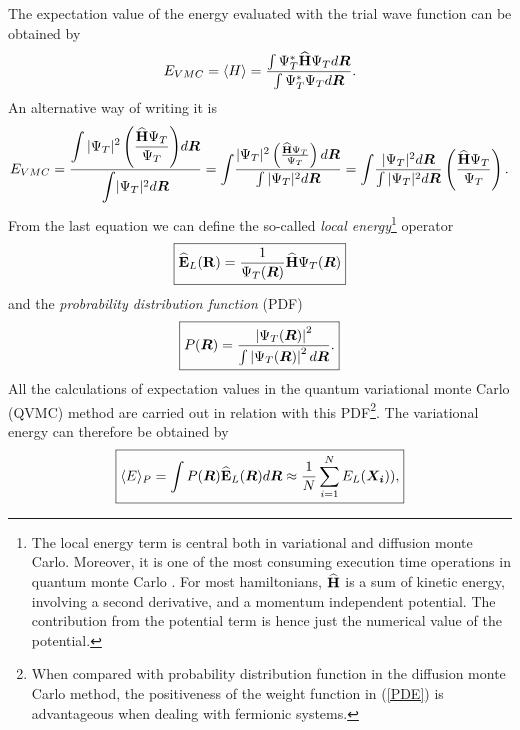 The expectation value of the energy evaluated with the trial wave function can be obtained by
\begin{equation}\label{evmc}
 E_{VMC}= \langle H \rangle =
   \frac{\int \Psi_{T}^{\ast} {\bf\widehat{H}} \Psi_T d{\boldsymbol{R}}}
        {\int \Psi_{T}^{\ast} \Psi_T d{\boldsymbol{R}}}.
\end{equation}
An alternative way of writing it is
\begin{equation}\label{derivationsVMC}
 E_{VMC}=  \frac{{\displaystyle\int |\Psi_{T}|^2 \left(\frac{{\bf\widehat{H}} \Psi_T }{\Psi_T}\right)} d{\boldsymbol{R}}}
        {{\displaystyle\int} |\Psi_{T}|^2 d\boldsymbol{R}} = {\displaystyle\int} \frac{|\Psi_{T}|^2 \left(\frac{{\bf\widehat{H}} \Psi_T }{\Psi_T}\right) d{\boldsymbol{R}}}{
        \int |\Psi_{T}|^2 d\boldsymbol{R}} = {\displaystyle\int} \frac{|\Psi_{T}|^2  d{\boldsymbol{R}}}{
        \int |\Psi_{T}|^2 d\boldsymbol{R}}\left(\frac{{\bf\widehat{H}} \Psi_T }{\Psi_T}\right).
\end{equation}
From the last equation we can define the so-called \emph{local energy}\footnote{The local energy term is central both in variational and diffusion monte Carlo. Moreover, it is one of the most consuming execution time operations in quantum monte Carlo \cite{PaulKent,Roestad}. For most hamiltonians, ${\bf\widehat{H}}$ is a sum of kinetic energy, involving a second derivative, and a momentum independent potential. 
The contribution from the potential term is hence just the numerical value of the potential.} operator
\begin{equation}\label{localEnergyOp}
\boxed{{\bf\widehat{E}}_L({\bf{R}})=\frac{1}{\Psi_T({\boldsymbol{R}})}{\bf\widehat{H}}\Psi_T({\boldsymbol{R}})}
\end{equation}
and the \emph{probrability distribution function} (PDF)
\begin{equation}\label{PDE}
 \boxed{P({\boldsymbol{R}})= \frac{\left|\Psi_T({\boldsymbol{R}})\right|^2}{\int \left|\Psi_T({\boldsymbol{R}})\right|^2d{\boldsymbol{R}}}.}
\end{equation}
All the calculations of expectation values in the quantum variational monte Carlo (QVMC) method are carried out in relation with this PDF\footnote{When compared with probability distribution function in the diffusion monte Carlo method, the positiveness of the weight function in (\ref{PDE}) is advantageous when dealing with fermionic systems.}. The variational energy can therefore be obtained by
\begin{equation}\label{variationalEnergy}
\boxed{\langle E \rangle_P = \int P({\boldsymbol{R}}){\bf\widehat{E}}_L({\boldsymbol{R}}) d{\boldsymbol{R}} \approx 
  \frac{1}{N}\sum_{i=1}^{N}E_L(\boldsymbol{X_i})),}
\end{equation}
